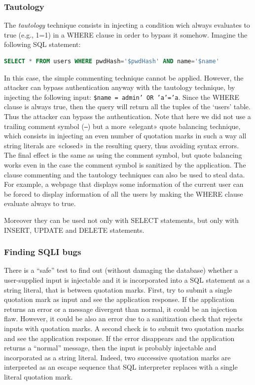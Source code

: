 \documentclass[a4paper,12pt]{article}
\begin{document}
\subsubsection{Tautology}
The \textit{tautology} technique consists in injecting a condition wich always evaluates to true (e.g., 1=1) in a WHERE clause in order to bypass it somehow. Imagine the following SQL statement:

\begin{lstlisting}[language=SQL, basicstyle=\ttfamily]
SELECT * FROM users WHERE pwdHash='$pwdHash' AND name='$name'
\end{lstlisting}

In this case, the simple commenting technique cannot be applied. However, the attacker can bypass authentication anyway with the tautology technique, by injecting the following input: \texttt{\$name = admin' OR 'a'='a}.
Since the WHERE clause is always true, then the query will return all the tuples of the ‘users’ table. Thus the attacker can bypass the authentication. Note that here we did not use a trailing comment symbol (\texttt{--}) but a more «elegant» quote balancing technique, which consists in injecting an even number of quotation marks in such a way all string literals are «closed» in the resulting query, thus avoiding syntax errors. The final effect is the same as using the comment symbol, but quote balancing works even in the case the comment symbol is sanitized by the application.
The clause commenting and the tautology techniques can also be used to steal data. For example, a webpage that displays some information of the current user can be forced to display information of all the users by making the WHERE clause evaluate always to true.

Moreover they can be used not only with SELECT statements, but only with INSERT, UPDATE and DELETE statements.

\subsubsection{Finding SQLI bugs}
There is a “safe” test to find out (without damaging the database) whether a user-supplied input is injectable and it is incorporated into a SQL statement as a string literal, that is between quotation marks. First, try to submit a single quotation mark as input and see the application response. If the application returns an error or a message divergent than normal, it could be an injection flaw. However, it could be also an error due to a sanitization check that rejects inputs with quotation marks. A second check is to submit two quotation marks and see the application response. If the error disappears and the application returns a “normal” message, then the input is probably injectable and incorporated as a string literal. Indeed, two successive quotation marks are interpreted as an escape sequence that SQL interpreter replaces with a single literal quotation mark.
\end{document}
